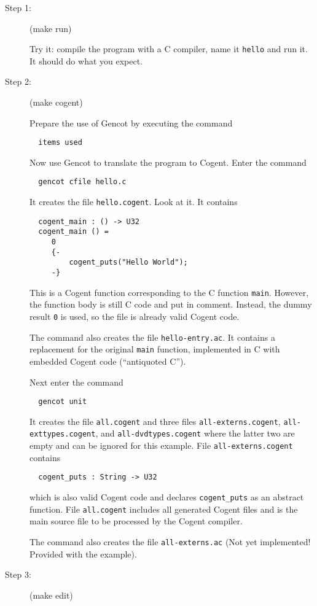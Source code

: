 \documentclass[a4paper]{report}
\newcommand{\code}[1]{\textnormal{\texttt{#1}}}
\begin{document}
\begin{description}
\item[Step 1:] (make run)

Try it: compile the program with a C compiler, name it \code{hello} and run it. It should do what you expect.

\item[Step 2:] (make cogent)

Prepare the use of Gencot by executing the command
\begin{verbatim}
  items used
\end{verbatim}

Now use Gencot to translate the program to Cogent. Enter the command
\begin{verbatim}
  gencot cfile hello.c
\end{verbatim}
It creates the file \code{hello.cogent}. Look at it. It contains
\begin{verbatim}
  cogent_main : () -> U32
  cogent_main () =
     0
     {-
         cogent_puts("Hello World");
     -}
\end{verbatim}
This is a Cogent function corresponding to the C function \code{main}. However, the function body is still C code
and put in comment. Instead, the dummy result \code{0} is used, so the file is already valid Cogent code.

The command also creates the file \code{hello-entry.ac}. It contains a replacement for the original \code{main}
function, implemented in C with embedded Cogent code (``antiquoted C''). 

Next enter the command
\begin{verbatim}
  gencot unit
\end{verbatim}
It creates the file \code{all.cogent} and three files \code{all-externs.cogent}, \code{all-exttypes.cogent}, 
and \code{all-dvdtypes.cogent} where the latter two are empty and can be ignored for this example. File 
\code{all-externs.cogent} contains
\begin{verbatim}
  cogent_puts : String -> U32
\end{verbatim}
which is also valid Cogent code and declares \code{cogent\_puts} as an abstract function. File \code{all.cogent}
includes all generated Cogent files and is the main source file to be processed by the Cogent compiler.

The command also creates the file \code{all-externs.ac} (Not yet implemented! Provided with the example).

\item[Step 3:] (make edit)


\end{description}
\end{document}
